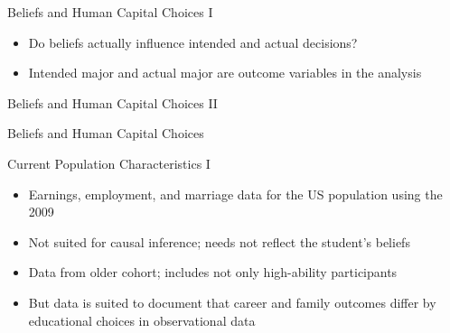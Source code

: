 \documentclass[12pt]{beamer}
\begin{document}
\begin{frame}{Beliefs and Human Capital Choices I}
    \begin{itemize}
        \item Do beliefs actually influence intended and actual decisions?
        \item Intended major and actual major are outcome variables in the analysis
    \end{itemize}  
\end{frame}

\begin{frame}{Beliefs and Human Capital Choices II}
     \begin{center}
    \end{center}
\end{frame}

\begin{frame}{Beliefs and Human Capital Choices }
    \begin{center}
    \end{center}
\end{frame}


\begin{frame}{Current Population Characteristics I}
    \begin{itemize}
        \item Earnings, employment, and marriage data for the US population using the 2009
        \item Not suited for causal inference; needs not reflect the student's beliefs
        \item Data from older cohort; includes not only high-ability participants
        \item But data is suited to document that career and family outcomes differ by educational choices in observational data
    \end{itemize}
\end{frame}
\end{document}
